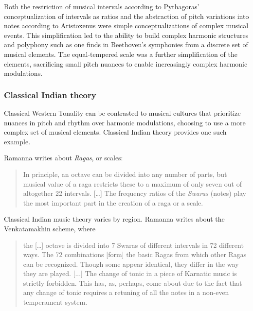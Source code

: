 Both the restriction of musical intervals according to Pythagoras' conceptualization of intervals as ratios and the abstraction of pitch variations into notes according to Aristoxenus were simple conceptualizations of complex musical events. This simplification led to the ability to build complex harmonic structures and polyphony such as one finds in Beethoven's symphonies from a discrete set of musical elements. The equal-tempered scale was a further simplification of the elements, sacrificing small pitch nuances to enable increasingly complex harmonic modulations. 

\subsubsection{Classical Indian theory}
Classical Western Tonality can be contrasted to musical cultures that prioritize nuances in pitch and rhythm over harmonic modulations, choosing to use a more complex set of musical elements. Classical Indian theory provides one such example. 

Ramanna writes about \textit{Ragas}, or scales: \begin{quotation}In principle, an octave can be divided into any number of parts, but musical value of a raga restricts these to a maximum of only seven out of altogether 22 intervals. […] The frequency ratios of the \textit{Swaras} (notes) play the most important part in the creation of a raga or a scale. \cite[][p.~897]{ramanna1995structure}\end{quotation} Classical Indian music theory varies by region. Ramanna writes about the Venkatamakhin scheme, where \begin{quotation}the […] octave is divided into 7 Swaras of different intervals in 72 different ways. The 72 combinations [form] the basic Ragas from which other Ragas can be recognized. Though some appear identical, they differ in the way they are played.\cite[][p.~898]{ramanna1995structure} [...] The change of tonic in a piece of Karnatic music is strictly forbidden. This has, as, perhaps, come about due to the fact that any change of tonic requires a retuning of all the notes in a non-even temperament system. \cite[p.~899]{ramanna1995structure}\end{quotation}

